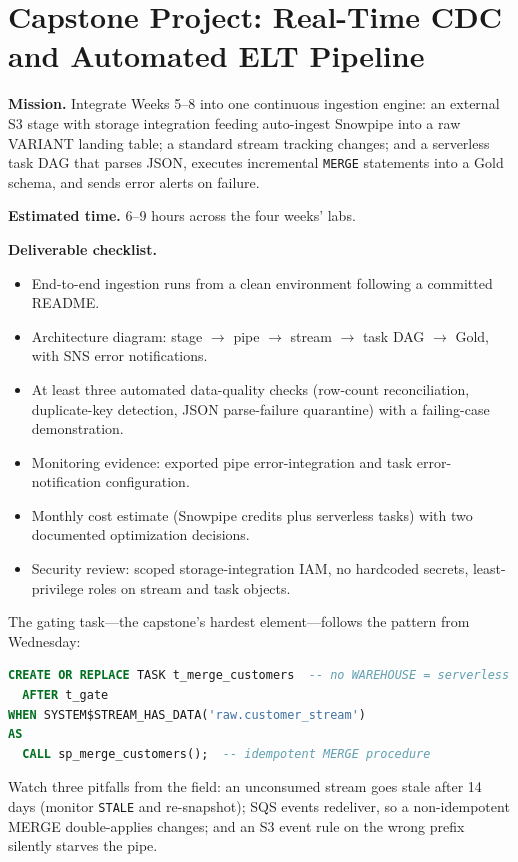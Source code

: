 \section{Capstone Project: Real-Time CDC and Automated ELT Pipeline}\label{sec:ch8-capstone}
\begin{capstonebox}
\textbf{Mission.} Integrate Weeks 5--8 into one continuous ingestion engine: an external S3 stage with storage integration feeding auto-ingest Snowpipe into a raw VARIANT landing table; a standard stream tracking changes; and a serverless task DAG that parses JSON, executes incremental \texttt{MERGE} statements into a Gold schema, and sends error alerts on failure.

\textbf{Estimated time.} 6--9 hours across the four weeks' labs.

\textbf{Deliverable checklist.}
\begin{itemize}
    \item End-to-end ingestion runs from a clean environment following a committed README.
    \item Architecture diagram: stage $\rightarrow$ pipe $\rightarrow$ stream $\rightarrow$ task DAG $\rightarrow$ Gold, with SNS error notifications.
    \item At least three automated data-quality checks (row-count reconciliation, duplicate-key detection, JSON parse-failure quarantine) with a failing-case demonstration.
    \item Monitoring evidence: exported pipe error-integration and task error-notification configuration.
    \item Monthly cost estimate (Snowpipe credits plus serverless tasks) with two documented optimization decisions.
    \item Security review: scoped storage-integration IAM, no hardcoded secrets, least-privilege roles on stream and task objects.
\end{itemize}
\end{capstonebox}

The gating task---the capstone's hardest element---follows the pattern from Wednesday:

\begin{lstlisting}[language=SQL, caption={Serverless task gated on the stream offset}]
CREATE OR REPLACE TASK t_merge_customers  -- no WAREHOUSE = serverless
  AFTER t_gate
WHEN SYSTEM$STREAM_HAS_DATA('raw.customer_stream')
AS
  CALL sp_merge_customers();  -- idempotent MERGE procedure
\end{lstlisting}

Watch three pitfalls from the field: an unconsumed stream goes stale after 14 days (monitor \texttt{STALE} and re-snapshot); SQS events redeliver, so a non-idempotent MERGE double-applies changes; and an S3 event rule on the wrong prefix silently starves the pipe.
